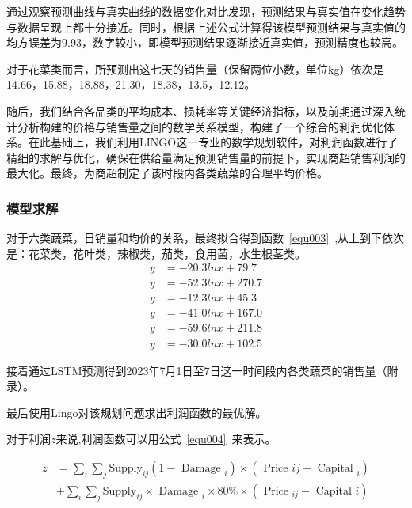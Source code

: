 \documentclass{cumcmthesis}
\begin{document}
通过观察预测曲线与真实曲线的数据变化对比发现，预测结果与真实值在变化趋势与数据呈现上都十分接近。同时，根据上述公式计算得该模型预测结果与真实值的均方误差为9.93，数字较小，即模型预测结果逐渐接近真实值，预测精度也较高。

对于花菜类而言，所预测出这七天的销售量（保留两位小数，单位kg）依次是14.66，15.88，18.88，21.30，18.38，13.5，12.12。

随后，我们结合各品类的平均成本、损耗率等关键经济指标，以及前期通过深入统计分析构建的价格与销售量之间的数学关系模型，构建了一个综合的利润优化体系。在此基础上，我们利用LINGO这一专业的数学规划软件，对利润函数进行了精细的求解与优化，确保在供给量满足预测销售量的前提下，实现商超销售利润的最大化。最终，为商超制定了该时段内各类蔬菜的合理平均价格。
\subsubsection{模型求解}
对于六类蔬菜，日销量和均价的关系，最终拟合得到函数~\ref{equ003}~,从上到下依次是：花菜类，花叶类，辣椒类，茄类，食用菌，水生根茎类。
\begin{equation}\label{equ003}
	\begin{aligned}
		y & = -20.3lnx + 79.7\\
		y & = -52.3lnx + 270.7\\
		y & = -12.3lnx + 45.3\\
		y & = -41.0lnx + 167.0\\
		y & = -59.6lnx + 211.8\\
		y & = -30.0lnx + 102.5
	\end{aligned}
\end{equation}

接着通过LSTM预测得到2023年7月1日至7日这一时间段内各类蔬菜的销售量（附录）。

最后使用Lingo对该规划问题求出利润函数的最优解。

对于利润$z$来说,利润函数可以用公式~\ref{equ004}~来表示。

\begin{equation}\label{equ004} 
	\begin{split}
	z&=\sum_i \sum_j \text{Supply}_{i j}\left(1-\text { Damage }_i\right) \times\left(\text { Price } i j-\text { Capital }_i\right)\\
	&+\sum_i \sum_j \text {Supply}_{i j} \times \text { Damage }_i \times 80 \% \times\left(\text { Price }_{i j}-\text { Capital } i\right)
	\end{split}
\end{equation}
\end{document}
